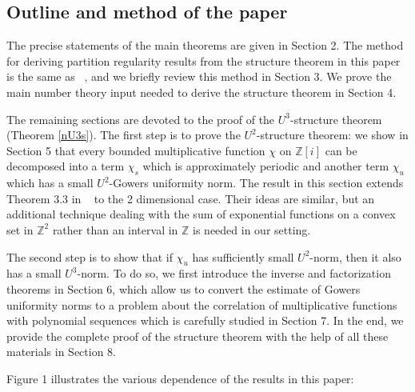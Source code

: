 \documentclass[12pt,amstex]{amsart}
\theoremstyle{definition}
\def \Z {\mathbb{Z}[i]}
\begin{document}
\subsection{Outline and method of the paper}
The precise statements of the main theorems are given in Section 2.
The method for deriving partition regularity results from the structure theorem in this paper is the same as ~\cite{FH}, and we briefly review this method in Section 3. We prove the main number theory input needed to derive the structure theorem in Section 4.

The remaining sections are devoted to the proof of the $U^{3}$-structure theorem (Theorem \ref{nU3s}). The first step is to prove the $U^{2}$-structure theorem: we show in Section 5 that every bounded multiplicative function $\chi$ on $\Z$ can be decomposed into a term $\chi_{s}$ which is approximately periodic and another term $\chi_{u}$ which has a small $U^{2}$-Gowers uniformity norm. The result in this section extends Theorem 3.3 in ~\cite{FH} to the 2 dimensional case. Their ideas are similar, but an additional technique dealing with the sum of exponential functions on a convex set in $\mathbb{Z}^{2}$ rather than an interval in $\mathbb{Z}$ is needed in our setting.

The second step is to show that if $\chi_{u}$ has sufficiently small $U^{2}$-norm, then it also has a small $U^{3}$-norm. To do so, we first introduce the inverse and factorization theorems in Section 6, which allow us to convert the estimate of Gowers uniformity norms to a problem about the correlation of multiplicative functions with polynomial sequences which is carefully studied in Section 7. In the end, we provide the complete proof of the structure theorem with the help of all these materials in Section 8.

Figure 1 illustrates the various dependence of the results in this paper:
\end{document}
